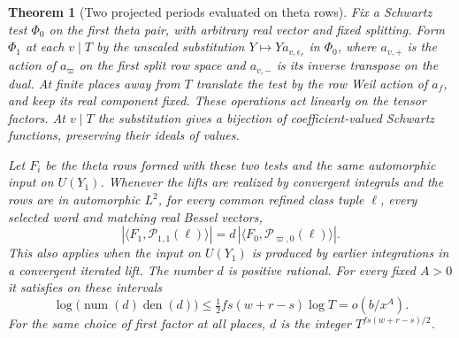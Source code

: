 \documentclass[a4paper,11pt]{article}
\newtheorem{theorem}[proposition]{Theorem}
\theoremstyle{definition}
\theoremstyle{remark}
\numberwithin{equation}{section}
\begin{document}
\begin{theorem}[Two projected periods evaluated on theta rows]
\label{thm:thetarow162}
Fix a Schwartz test \(\Phi_0\) on the first theta pair, with
arbitrary real vector and fixed splitting. Form \(\Phi_1\) at
each \(v\mid T\) by the unscaled substitution
\(Y\mapsto Y a_{v,\epsilon_v}\) in \(\Phi_0\), where \(a_{v,+}\)
is the action of \(a_\varpi\) on the first split row space and
\(a_{v,-}\) is its inverse transpose on the dual. At finite
places away from \(T\) translate the test by the row Weil
action of \(a_f\), and keep its real component fixed. These
operations act linearly on the tensor factors. At \(v\mid T\)
the substitution gives a bijection of coefficient-valued
Schwartz functions, preserving their ideals of values.

Let \(F_i\) be the theta rows formed with these two tests and
the same automorphic input on \(U(Y_1)\). Whenever the lifts
are realized by convergent integrals and the rows are in
automorphic \(L^2\), for every common refined class tuple
\(\ell\), every selected word and matching real Bessel vectors,
\begin{equation}
   \left|\big\langle F_1,\mathcal P_{1,1}(\ell)\big\rangle\right|
      = d\,
   \left|\big\langle F_0,\mathcal P_{\varpi,0}(\ell)\big\rangle\right|.
   \label{eq:thetarow162}
\end{equation}
This also applies when the input on \(U(Y_1)\) is produced by
earlier integrations in a convergent iterated lift. The number
\(d\) is positive rational. For every fixed \(A>0\) it satisfies
on these intervals
\[
     \log\big(\operatorname{num}(d)\operatorname{den}(d)\big)
         \le \tfrac12 fs(w+r-s)\log T=o(b/x^A).
\]
For the same choice of first factor at all places, \(d\) is
the integer \(T^{fs(w+r-s)/2}\).
\end{theorem}
\end{document}
